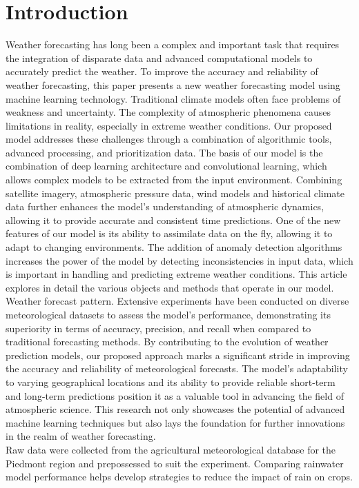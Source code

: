 \documentclass[conference]{IEEEtran}
\begin{document}
\section{\textbf{Introduction}}
Weather forecasting has long been a complex and important task that requires the integration of disparate data and advanced computational models to accurately predict the weather. To improve the accuracy and reliability of weather forecasting, this paper presents a new weather forecasting model using machine learning technology. Traditional climate models often face problems of weakness and uncertainty. The complexity of atmospheric phenomena causes limitations in reality, especially in extreme weather conditions. Our proposed model addresses these challenges through a combination of algorithmic tools, advanced processing, and prioritization data. The basis of our model is the combination of deep learning architecture and convolutional learning, which allows complex models to be extracted from the input environment. Combining satellite imagery, atmospheric pressure data, wind models and historical climate data further enhances the model's understanding of atmospheric dynamics, allowing it to provide accurate and consistent time predictions. One of the new features of our model is its ability to assimilate data on the fly, allowing it to adapt to changing environments. The addition of anomaly detection algorithms increases the power of the model by detecting inconsistencies in input data, which is important in handling and predicting extreme weather conditions. This article explores in detail the various objects and methods that operate in our model. Weather forecast pattern. Extensive experiments have been conducted on diverse meteorological datasets to assess the model's performance, demonstrating its superiority in terms of accuracy, precision, and recall when compared to traditional forecasting methods. By contributing to the evolution of weather prediction models, our proposed approach marks a significant stride in improving the accuracy and reliability of meteorological forecasts. The model's adaptability to varying geographical locations and its ability to provide reliable short-term and long-term predictions position it as a valuable tool in advancing the field of atmospheric science. This research not only showcases the potential of advanced machine learning techniques but also lays the foundation for further innovations in the realm of weather forecasting.
\\ \indent Raw data were collected from the agricultural meteorological database for the Piedmont region and prepossessed to suit the experiment. Comparing rainwater model performance helps develop strategies to reduce the impact of rain on crops.
\end{document}
